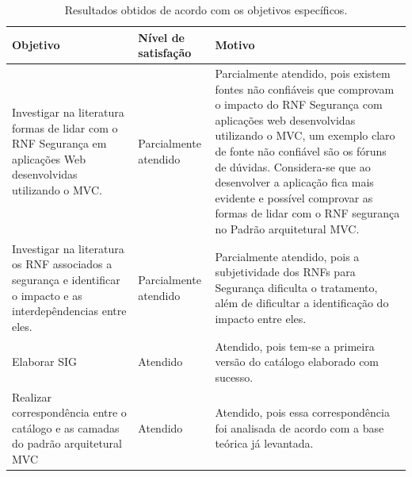\begin{table}[h!]
	\centering
	\caption{Resultados obtidos de acordo com os objetivos específicos.}
	\label{resultadosObtidos}
	\tiny
	\begin{tabular}{@{}p{6cm}p{3cm}p{6cm}@{}}
		\toprule
		\textbf{Objetivo} & \textbf{Nível de satisfação} & \textbf{Motivo} \\ \midrule
		Investigar na literatura formas de lidar com o RNF Segurança  em aplicações Web desenvolvidas utilizando o MVC. & Parcialmente atendido & Parcialmente atendido, pois existem fontes não confiáveis que comprovam o impacto do RNF Segurança com aplicações web desenvolvidas utilizando o MVC, um exemplo claro de fonte não confiável são os fóruns de dúvidas. Considera-se que ao desenvolver a aplicação fica mais evidente e possível comprovar as formas de lidar com o RNF segurança no Padrão arquitetural MVC. \\
		\rowcolor[HTML]{C0C0C0} 
		Investigar na literatura os RNF associados a segurança e identificar o impacto e as interdepêndencias entre eles. & Parcialmente atendido & Parcialmente atendido, pois a subjetividade dos RNFs para Segurança dificulta o tratamento, além de dificultar a identificação do impacto entre eles. \\
		Elaborar SIG & Atendido & Atendido, pois tem-se a primeira versão do catálogo elaborado com sucesso. \\
		\rowcolor[HTML]{C0C0C0} 
		Realizar correspondência entre o catálogo e as camadas do padrão arquitetural MVC & Atendido & Atendido, pois essa correspondência foi analisada de acordo com a base teórica já levantada. \\ \bottomrule
	\end{tabular}
\end{table}
